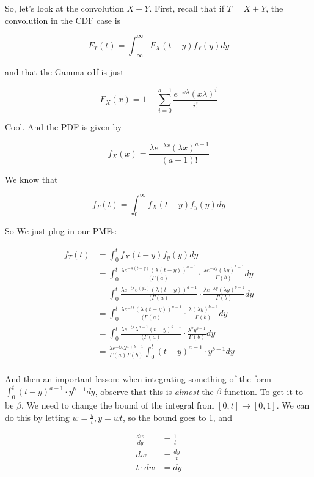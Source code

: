 \documentclass{article}
\begin{document}
			So, let's look at the convolution $X+Y$. First, recall that if $T=X+Y$,  the convolution in the CDF case is
			
			\[ F_T(t) = \int^\infty_{-\infty} F_X(t-y)f_Y(y) dy \]
		
			and that the Gamma cdf is just
			
			\[ F_X(x) = 1 - \sum^{a-1}_{i=0} \frac{e^{-x\lambda}(x\lambda)^i}{i!} \]
			
			Cool. And the PDF is given by
			
			\[ f_X(x) = \frac{\lambda e^{-\lambda x}(\lambda x)^{a-1}}{(a-1)!}  \]
		
			We know that
			
			\[ f_T(t) = \int^\infty_0 f_X(t-y)f_y(y)dy \]
		
			So We just plug in our PMFs:
			
			\begin{align*}
			 f_T(t) &= \int^t_0 f_X(t-y)f_y(y)dy\\
			 &= \int^t_0 \frac{\lambda e^{-\lambda (t-y)}(\lambda (t-y))^{a-1}}{(\Gamma(a)} \cdot \frac{\lambda e^{-\lambda y}(\lambda y)^{b-1}}{\Gamma(b)} dy\\	
			 &= \int^t_0 \frac{\lambda e^{-t\lambda}e^{ (y\lambda)}(\lambda (t-y))^{a-1}}{(\Gamma(a)} \cdot \frac{\lambda e^{-\lambda y}(\lambda y)^{b-1}}{\Gamma(b)} dy\\
			 &= \int^t_0 \frac{\lambda e^{-t\lambda}(\lambda (t-y))^{a-1}}{(\Gamma(a)} \cdot \frac{\lambda (\lambda y)^{b-1}}{\Gamma(b)} dy\\
			 &= \int^t_0 \frac{\lambda e^{-t\lambda}\lambda^{a-1} (t-y)^{a-1}}{(\Gamma(a)} \cdot \frac{\lambda^{b} y^{b-1}}{\Gamma(b)} dy\\	
			 &= \frac{\lambda e^{-t\lambda}\lambda^{a+b-1}}{\Gamma(a)\Gamma(b)}\int^t_0 (t-y)^{a-1} \cdot  y^{b-1} dy\\			 
			\end{align*}
			
			And then an important lesson: when integrating  something of the form $\int^t_0 (t-y)^{a-1} \cdot  y^{b-1} dy$, observe that this is \textit{almost} the $\beta$ function. To get it to be $\beta$, We need to change the bound of the integral from $[0, t]\to[0, 1]$. We can do this by letting $w = \frac{y}{t}, y=wt$, so the bound goes to 1, and 
			
			\begin{align*}
			\frac{dw}{dy} &= \frac{1}{t} \\
			dw &= \frac{dy}{t}\\
			t\cdot dw &= dy
			\end{align*}			
			
\end{document}
